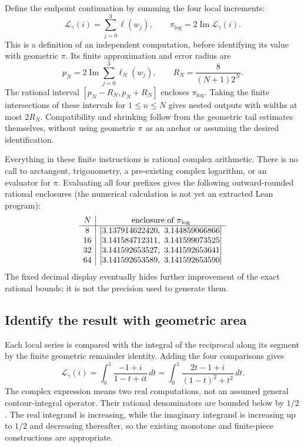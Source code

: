 Define the endpoint continuation by summing the four local increments:
\[
 \mathcal L_\gamma(i)=\sum_{j=0}^3\ell(w_j),\qquad
 \pi_{\log}=2\operatorname{Im}\mathcal L_\gamma(i).
\]
This is a definition of an independent computation, before identifying its
value with geometric $\pi$. Its finite approximation and error radius are
\[
 p_N=2\operatorname{Im}\sum_{j=0}^3\ell_N(w_j),\qquad
 R_N=\frac{8}{(N+1)2^N}.
\]
The rational interval $[p_N-R_N,p_N+R_N]$ encloses $\pi_{\log}$.
Taking the finite intersections of these intervals for $1\le n\le N$
gives nested outputs with widths at most $2R_N$. Compatibility and shrinking
follow from the geometric tail estimates themselves, without using geometric
$\pi$ as an anchor or assuming the desired identification.

Everything in these finite instructions is rational complex arithmetic.
There is no call to arctangent, trigonometry, a pre-existing complex logarithm,
or an evaluator for $\pi$. Evaluating all four prefixes gives the following
outward-rounded rational enclosures (the numerical calculation is not yet
an extracted Lean program):
\[
\begin{array}{c|c}
 N&\hbox{enclosure of }\pi_{\log}\\\hline
 8 &[3.137914622420,\ 3.144859066866]\\
 16&[3.141584712311,\ 3.141599073525]\\
 32&[3.141592653527,\ 3.141592653641]\\
 64&[3.141592653589,\ 3.141592653590]
\end{array}
\]
The fixed decimal display eventually hides further improvement of the exact
rational bounds; it is not the precision used to generate them.

\subsection{Identify the result with geometric area}
Each local series is compared with the integral of the reciprocal along
its segment by the finite geometric remainder identity. Adding the four
comparisons gives
\[
 \mathcal L_\gamma(i)
 =\int_0^1\frac{-1+i}{1-t+it}\,dt
 =\int_0^1\frac{2t-1+i}{(1-t)^2+t^2}\,dt.
\]
The complex expression means two real computations, not an assumed general
contour-integral operator. Their rational denominators are bounded below
by $1/2$. The real integrand is increasing, while the imaginary integrand
is increasing up to $1/2$ and decreasing thereafter, so the existing monotone
and finite-piece constructions are appropriate.

